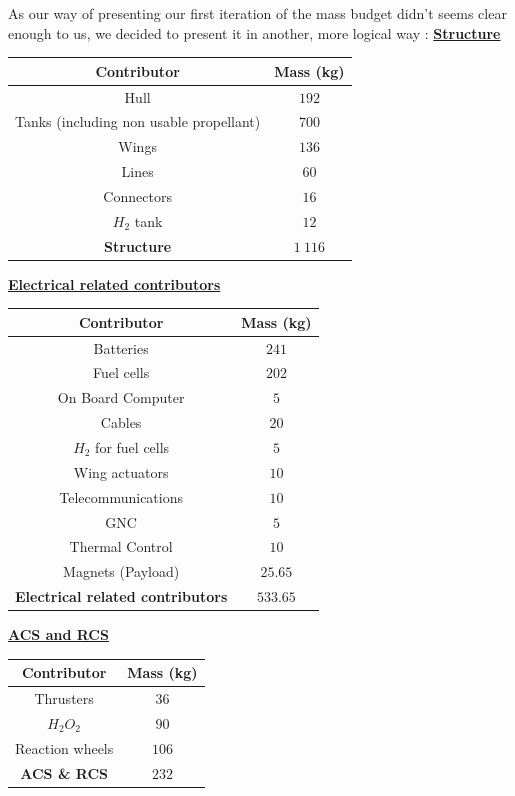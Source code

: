 \qquad As our way of presenting our first iteration of the mass budget didn't seems clear enough to us, we decided to present it in another, more logical way :
\textbf{\underline{Structure}}
\begin{center}
	\begin{tabular}[H]{|c|c|}
		\hline
		\cellcolor{gray!50}Contributor & \cellcolor{gray!50}Mass (kg)\\
		\hline
		Hull & $192$\\
		\hline
		Tanks (including non usable propellant) & $700$\\
		\hline
		Wings & $136$\\
		\hline
		Lines & $60$\\
		\hline
		Connectors & $16$\\
		\hline
		$H_2$ tank & $12$\\
		\hline
		\cellcolor{green!30}\textbf{Structure} & \textbf{$1\ 116$}\\
		\hline
	\end{tabular}
\end{center}

\textbf{\underline{Electrical related contributors}}
\begin{center}
	\begin{tabular}[H]{|c|c|}
		\hline
		\cellcolor{gray!50}Contributor & \cellcolor{gray!50}Mass (kg)\\
		\hline
		Batteries & $241$\\
		\hline
		Fuel cells & $202$\\
		\hline
		On Board Computer & $5$\\
		\hline
		Cables & $20$\\
		\hline
		$H_2$ for fuel cells & $5$\\
		\hline
		Wing actuators & $10$\\
		\hline
		Telecommunications & $10$\\
		\hline
		GNC & $5$\\
		\hline
		Thermal Control & $10$\\
		\hline
		Magnets (Payload) & $25.65$\\
		\hline
		\cellcolor{green!30}\textbf{Electrical related contributors} & \textbf{$533.65$}\\
		\hline
	\end{tabular}
\end{center}

\textbf{\underline{ACS and RCS}}
\begin{center}
	\begin{tabular}[H]{|c|c|}
		\hline
		\cellcolor{gray!50}Contributor & \cellcolor{gray!50}Mass (kg)\\
		\hline
		Thrusters & $36$\\
		\hline
		$H_2O_2$ & $90$\\
		\hline
		Reaction wheels & $106$\\
		\hline
		\cellcolor{green!30}\textbf{ACS \& RCS} & \textbf{$232$}\\
		\hline
	\end{tabular}
\end{center}

